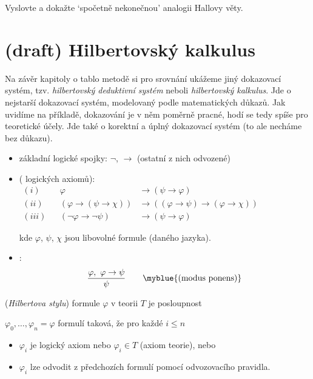 \begin{exercise}
    Vyslovte a dokažte `spočetně nekonečnou' analogii Hallovy věty.
\end{exercise}

\section{(draft) Hilbertovský kalkulus}\label{section:hilbert-calculus-propositional}
\todo
Na závěr kapitoly o tablo metodě si pro srovnání ukážeme jiný dokazovací systém, tzv. \emph{hilbertovský deduktivní systém} neboli \emph{hilbertovský kalkulus}. Jde o nejstarší dokazovací systém, modelovaný podle matematických důkazů. Jak uvidíme na příkladě, dokazování je v něm poměrně pracné, hodí se tedy spíše pro teoretické účely. Jde také o korektní a úplný dokazovací systém (to ale necháme bez důkazu).


\begin{itemize}
    \item základní logické spojky: $\neg$, $\to$ (ostatní z nich odvozené)
    
    \item {} ( logických axiomů):
    \vspace{-2mm}\begin{align*}(i)& &\varphi &\to (\psi \to \varphi) \\
    (ii)& &(\varphi\to (\psi \to \chi))&\to ((\varphi \to \psi)\to(\varphi \to \chi))\qquad\qquad\qquad\qquad\phantom{\ } \\
    (iii)& &(\neg \varphi \to \neg \psi)&\to(\psi \to \varphi)
    \end{align*}
    
    \vspace{-2mm}
    kde $\varphi$, $\psi$, $\chi$ jsou libovolné formule (daného jazyka).
    \item {}:
    \vspace{-3mm}
    $$\frac{\varphi,\ \varphi \to \psi}{\psi}\qquad\text{\myblue{(modus ponens)}}$$
    \end{itemize}
    
    \vspace{-1mm}
     (\emph{Hilbertova stylu}) formule $\varphi$ v teorii $T$ je  posloupnost
    \smallskip
    
    $\varphi_0, \dots, \varphi_n=\varphi$ formulí taková, že pro každé $i\le n$
    \begin{itemize}
    \item $\varphi_i$ je logický axiom nebo $\varphi_i \in T$ (axiom teorie), nebo
    \item $\varphi_i$ lze odvodit z předchozích formulí pomocí odvozovacího pravidla.
    \end{itemize}
    
